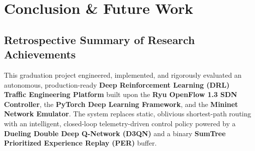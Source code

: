 \chapter{Conclusion \& Future Work}
\label{chap:conclusion}

\section{Retrospective Summary of Research Achievements}
This graduation project engineered, implemented, and rigorously evaluated an autonomous, production-ready \textbf{Deep Reinforcement Learning (DRL) Traffic Engineering Platform} built upon the \textbf{Ryu OpenFlow 1.3 SDN Controller}, the \textbf{PyTorch Deep Learning Framework}, and the \textbf{Mininet Network Emulator}. The system replaces static, oblivious shortest-path routing with an intelligent, closed-loop telemetry-driven control policy powered by a \textbf{Dueling Double Deep Q-Network (D3QN)} and a binary \textbf{SumTree Prioritized Experience Replay (PER)} buffer.

